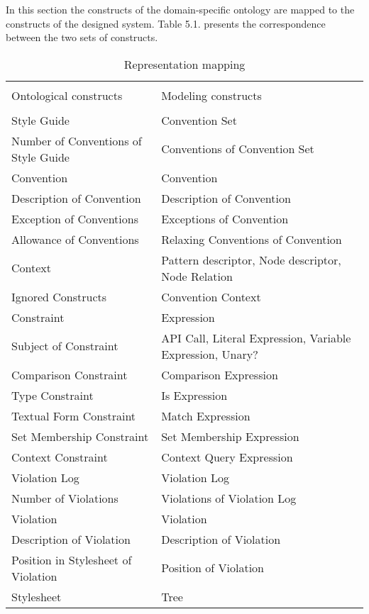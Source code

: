 \documentclass[parskip=full]{uvamscse}
\begin{document}
In this section the constructs of the domain-specific ontology are mapped to the constructs of the
designed system. Table 5.1. presents the correspondence between the two sets of constructs.

\begin{center}
\begin{longtable}{ | p{17em} | p{23em} | } 
\caption{Representation mapping}\\
\hline
 &  \\
Ontological constructs & Modeling constructs \\
 &  \\
\hline
Style Guide & Convention Set \\ \hline
Number of Conventions of Style Guide & Conventions of Convention Set \\ \hline
Convention & Convention \\ \hline
Description of Convention  & Description of Convention \\ \hline
Exception of Conventions & Exceptions of Convention \\ \hline
Allowance of Conventions & Relaxing Conventions of Convention \\ \hline
Context & Pattern descriptor, Node descriptor, Node Relation \\ \hline
Ignored Constructs & Convention Context \\ \hline
Constraint & Expression \\ \hline
Subject of Constraint & API Call, Literal Expression, Variable Expression, Unary? \\ \hline
Comparison Constraint & Comparison Expression \\ \hline
Type Constraint & Is Expression \\ \hline
Textual Form Constraint & Match Expression \\ \hline
Set Membership Constraint & Set Membership Expression \\ \hline
Context Constraint & Context Query Expression \\ \hline
Violation Log & Violation Log \\ \hline
Number of Violations & Violations of Violation Log \\ \hline
Violation & Violation \\ \hline
Description of Violation & Description of Violation \\ \hline
Position in Stylesheet of Violation & Position of Violation \\ \hline
Stylesheet & Tree \\ \hline

\end{longtable}
\end{center}
\end{document}
